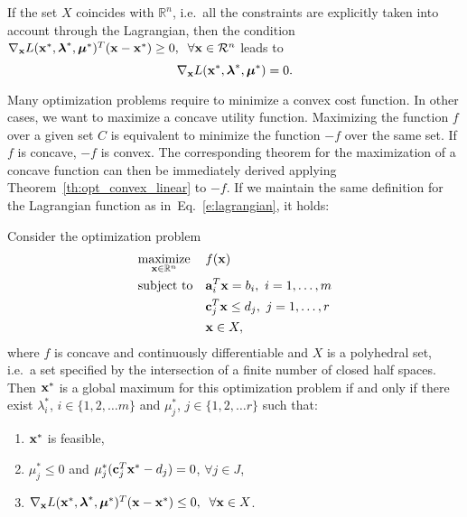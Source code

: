 \begin{remark}[$X=\mathbb{R}^n$]
If the set $X$ coincides with $\mathbb{R}^n$, i.e.~all the constraints are explicitly taken into account through the Lagrangian, then the condition $\nabla_{\mathbf{x}} L(\mathbf{x}^*,\boldsymbol{\lambda}^*,\boldsymbol{\mu}^*)^T (\mathbf{x} - \mathbf{x}^*) \ge 0, \;\; \forall \mathbf{x} \in \mathcal{R}^n$ leads to
\[
	\nabla_{\mathbf{x}} L(\mathbf{x}^*,\boldsymbol{\lambda}^*,\boldsymbol{\mu}^*)=0.
\] 
\end{remark}

Many optimization problems require to minimize a convex cost function. 
In other cases, we want to maximize a concave utility function.
Maximizing the function $f$ over a given set $C$ is equivalent to minimize the function $-f$ over the same set.
If $f$ is concave, $-f$ is convex.
The corresponding theorem for the maximization of a concave function can then be immediately derived applying Theorem~\ref{th:opt_convex_linear} to $-f$. If we maintain the same definition for the Lagrangian function as in~Eq.~\eqref{e:lagrangian}, it holds:

\begin{theorem}
Consider the optimization problem
\begin{equation}
\begin{aligned}
& \underset{\mathbf{x} \in \mathbb{R}^n}{\textnormal{maximize}}
	& & f(\mathbf{x}) \\
& \textnormal{subject to}
      & &  \mathbf{a}_i^T \mathbf{x}=b_i, \text{  }i=1,\dots,m\\
&       & & \mathbf{c}_j^T \mathbf{x} \le d_j, \text{  }j=1,\dots,r\\
&	& & \mathbf{x} \in X,
\end{aligned}
\end{equation}
where $f$ is concave and continuously differentiable and $X$ is a polyhedral set, i.e.~a set specified by the intersection of a finite number of closed half spaces. 
Then $\mathbf{x}^*$ is a global maximum for this optimization problem if and only if there exist $\lambda_i^*$, $i \in \{1,2,\dots m\}$ and $\mu_j^*$, $j \in \{1,2, \dots r\}$ such that:
\begin{enumerate}
\item $\mathbf{x}^*$ is feasible,
\item $\mu_j^*\le 0$ and $\mu_j^* (\mathbf{c}_j^T \mathbf{x}^* - d_j) =0$, $\forall j \in J$,
\item $\nabla_{\mathbf{x}} L(\mathbf{x}^*,\boldsymbol{\lambda}^*,\boldsymbol{\mu}^*)^T (\mathbf{x} - \mathbf{x}^*) \le 0, \;\; \forall \mathbf{x} \in X$.
\end{enumerate}
\label{th:opt_concave_linear}
\end{theorem}



